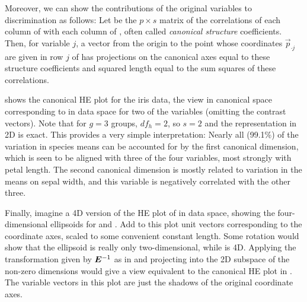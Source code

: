 Moreover, we can show the contributions of the original variables to discrimination
as follows:  Let  be the $p \times s$ matrix of the correlations of
each column of  with each column of , often called
\emph{canonical structure} coefficients.
Then, for variable $j$, a
vector from the origin
to the point whose coordinates $\vec{p}_{\cdot j}$ are given in row $j$ of 
has projections on the canonical axes equal to these structure coefficients
and squared length equal to the sum squares of these correlations.

 shows the canonical HE plot for the iris data, the
view in canonical space corresponding to  in data space
for two of the variables (omitting the contrast vectors).
Note that for $g=3$ groups, $df_h=2$, so $s=2$ and the representation in 2D is exact.
This provides a very simple interpretation:  Nearly all (99.1\%)
of the variation in species means can be accounted for by the first canonical dimension,
which is seen to be aligned with three of the four variables, most strongly with
petal length.  The second canonical dimension is mostly related to variation in the
means on sepal width, and this variable is negatively correlated with the
other three.

Finally, imagine a 4D version of the HE plot of  in data space,
showing the four-dimensional ellipsoids for  and .  Add to this plot
unit vectors corresponding to the coordinate axes, scaled to some convenient constant length.
Some rotation would
show that the 
ellipsoid is really only two-dimensional, while  is 4D.
Applying the transformation given by $\bm{\bm{E}}^{-1}$ as in 
and projecting into the 2D subspace of the non-zero dimensions would give a view equivalent to the
canonical HE plot in .
The variable vectors in this plot are just the shadows of the original coordinate axes.


